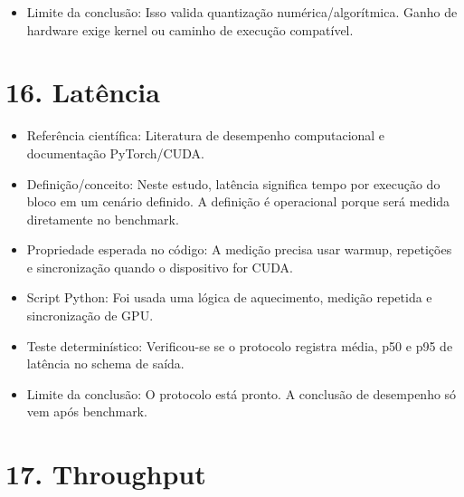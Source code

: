 \begin{itemize}
\item Limite da conclusão:
Isso valida quantização numérica/algorítmica. Ganho de hardware exige kernel
ou caminho de execução compatível.
\end{itemize}



\section{16. Latência}


\begin{itemize}
\item Referência científica:
Literatura de desempenho computacional e documentação PyTorch/CUDA.
\end{itemize}

\begin{itemize}
\item Definição/conceito:
Neste estudo, latência significa tempo por execução do bloco em um cenário
definido. A definição é operacional porque será medida diretamente no
benchmark.
\end{itemize}

\begin{itemize}
\item Propriedade esperada no código:
A medição precisa usar warmup, repetições e sincronização quando o dispositivo
for CUDA.
\end{itemize}

\begin{itemize}
\item Script Python:
Foi usada uma lógica de aquecimento, medição repetida e sincronização de GPU.
\end{itemize}

\begin{itemize}
\item Teste determinístico:
Verificou-se se o protocolo registra média, p50 e p95 de latência no schema de
saída.
\end{itemize}

\begin{itemize}
\item Limite da conclusão:
O protocolo está pronto. A conclusão de desempenho só vem após benchmark.
\end{itemize}



\section{17. Throughput}


